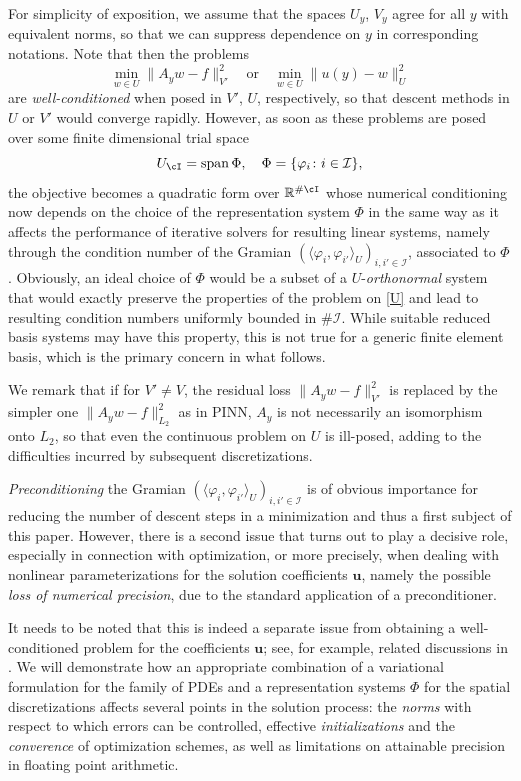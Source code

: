 \documentclass[a4paper,11pt]{amsart}
\numberwithin{equation}{section}
\theoremstyle{definition}
\theoremstyle{remark}
\theoremstyle{plain}
\newcommand{\R}{\mathbb{R}}
\begin{document}
For simplicity of exposition, we assume that the spaces $U_y$, $V_y$ agree for all $y$ with equivalent norms, so that we can
suppress dependence on $y$ in corresponding notations. Note that then the problems
\begin{equation}
\label{U}
\min_{w\in U}\|A_y w- f\|^2_{V'}\quad \mbox{or}\quad \min_{w\in U}\|u(y)-w\|^2_U
\end{equation}
are {\em well-conditioned} when posed in $V'$, $U$, respectively, so that descent methods in $U$ or $V'$ would converge rapidly. However, as soon as these problems are posed over some finite dimensional
trial space 
\[
U_\cI = {\rm span}\,\Phi,\quad  \Phi = \{ \varphi_i \colon i  \in \mathcal I\}, 
\]
the objective becomes a quadratic form over $\R^{\#\cI}$ whose numerical conditioning now depends
on the choice of the representation system $\Phi$ in the same way as it affects 
the performance of iterative solvers for resulting linear systems, namely through the
condition number of the Gramian $(\langle \varphi_i, \varphi_{i'}\rangle_U )_{i,i' \in \mathcal I}$, associated to $\Phi$. Obviously, an ideal choice of $\Phi$ would be a subset of a
$U$-{\em orthonormal} system that would exactly preserve the properties of the problem on \eqref{U} and lead to resulting condition numbers uniformly bounded in $\#\mathcal I$.
While suitable reduced basis systems may have  this property, this is not true 
for a generic finite element basis, which is the primary concern in what follows.    


 We remark that if for $V'\neq V$, the residual loss $\|A_y w- f\|^2_{V'}$ is replaced by the simpler one
$\|A_y w- f\|^2_{L_2}$ as in PINN, $A_y$ is not necessarily an isomorphism onto $L_2$, so that even the continuous problem on $U$ is ill-posed, adding
to the difficulties incurred by subsequent discretizations.

{\em Preconditioning} the Gramian $(\langle \varphi_i, \varphi_{i'}\rangle_U )_{i,i' \in \mathcal I}$ is of obvious importance for reducing the number of descent steps in
a minimization and thus a first subject of this paper. However, there is a second issue
that turns out to play a decisive role, especially in connection with optimization, or more precisely,
when dealing with nonlinear parameterizations for the solution coefficients $\mathbf u$, namely the possible {\em loss of numerical precision}, due to the standard application of a preconditioner.

 
It needs to be noted  that this is indeed a separate issue from obtaining a well-conditioned problem for the coefficients $\mathbf{u}$; see, for example, related discussions in 
\cite{BK20,MR4839137}.  We will demonstrate how 
an appropriate combination of a variational formulation for the family of PDEs and a representation systems $\Phi$ for the spatial discretizations affects several points in the solution process: the {\em norms} with respect to which errors can be controlled,   effective {\em initializations} and the {\em converence} of optimization schemes, as well as  limitations on attainable precision in floating point arithmetic.
\end{document}
